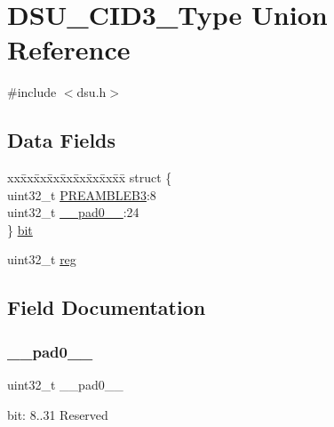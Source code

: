 \hypertarget{union_d_s_u___c_i_d3___type}{}\section{D\+S\+U\+\_\+\+C\+I\+D3\+\_\+\+Type Union Reference}
\label{union_d_s_u___c_i_d3___type}


{\ttfamily \#include $<$dsu.\+h$>$}

\subsection*{Data Fields}
\begin{DoxyCompactItemize}
\item 
\begin{tabbing}
xx\=xx\=xx\=xx\=xx\=xx\=xx\=xx\=xx\=\kill
struct \{\\
\>uint32\_t \mbox{\hyperlink{union_d_s_u___c_i_d3___type_a9cffca5c6c08af4f95d0c25130ece9e3}{PREAMBLEB3}}:8\\
\>uint32\_t \mbox{\hyperlink{union_d_s_u___c_i_d3___type_a3e57c2ef1c3ffb36722f000cc1156824}{\_\_pad0\_\_}}:24\\
\} \mbox{\hyperlink{union_d_s_u___c_i_d3___type_acd0a5e7f2c8405385eb3cc1c762ddfd6}{bit}}\\

\end{tabbing}\item 
uint32\+\_\+t \mbox{\hyperlink{union_d_s_u___c_i_d3___type_a6b91636401516a477989a336376d7b40}{reg}}
\end{DoxyCompactItemize}


\subsection{Field Documentation}
\mbox{\label{union_d_s_u___c_i_d3___type_a3e57c2ef1c3ffb36722f000cc1156824}} 
\subsubsection{\texorpdfstring{\_\_pad0\_\_}{\_\_pad0\_\_}}
{\footnotesize\ttfamily uint32\+\_\+t \+\_\+\+\_\+pad0\+\_\+\+\_\+}

bit\+: 8..31 Reserved \mbox{\label{union_d_s_u___c_i_d3___type_acd0a5e7f2c8405385eb3cc1c762ddfd6}} 
